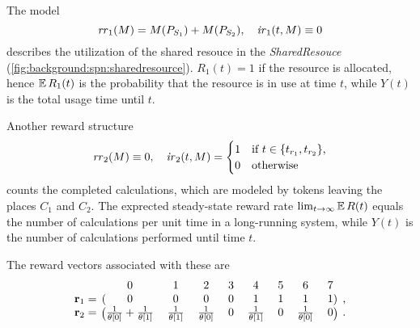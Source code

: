 \begin{runningExample}
  The  model
  \begin{equation}
    \mathit{rr}_1(M) = M(P_{S_1}) + M(P_{S_2}), \quad
    \mathit{ir}_1(t, M) \equiv 0
  \end{equation}
  describes the utilization of the shared resouce in the
  \emph{SharedResouce} 
  (\vref{fig:background:spn:sharedresource}). $R_1(t) = 1$ if the
  resource is allocated, hence $\operatorname{\mathbb{E}} R_1(t)$ is the probability that
  the resource is in use at time $t$, while $Y(t)$ is the total usage
  time until $t$.

  Another reward structure
  \begin{equation}
    \mathit{rr}_2(M) \equiv 0, \quad \mathit{ir}_2(t, M) = \begin{cases}
      1 & \text{if $t \in \{t_{r_1}, t_{r_2}\}$,} \\
      0 & \text{otherwise}
    \end{cases}
  \end{equation}
  counts the completed calculations, which are modeled by tokens
  leaving the places $C_1$ and $C_2$. The exprected steady-state
  reward rate $\lim_{t \to \infty} \operatorname{\mathbb{E}} R(t)$ equals the number of
  calculations per unit time in a long-running system, while $Y(t)$ is
  the number of calculations performed until time $t$.

  The reward vectors associated with these  are
  \begin{align}
    \begin{blockarray}{l@{\mkern 15mu}*{8}{c}@{\mkern 15mu}r}
      & 0 & 1 & 2 & 3 & 4 & 5 & 6 & 7 & \\
      \begin{block}{l@{\mkern 15mu}(*{8}{c})@{\mkern 15mu}r}
        \vec{r}_1 = & 0 & 0 & 0 & 0 & 1 & 1 & 1 & 1 & \text,\\
      \end{block}
      \begin{block}{l@{\mkern 15mu}(*{8}{c})@{\mkern 15mu}r}
        \vec{r}_2 = & \frac{1}{\theta[0]} + \frac{1}{\theta[1]}
        & \frac{1}{\theta[1]} & \frac{1}{\theta[0]}
        & 0 & \frac{1}{\theta[1]} & 0 & \frac{1}{\theta[0]} & 0 & \text.\\
      \end{block}
    \end{blockarray}
  \end{align}
\end{runningExample}

